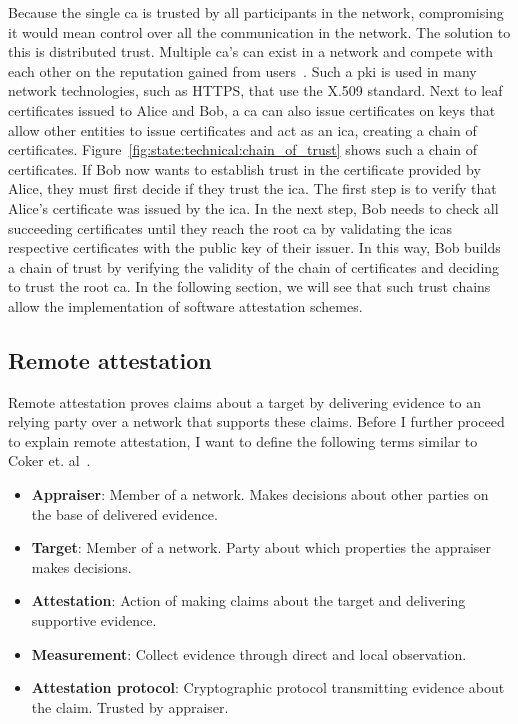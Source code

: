 Because the single \gls{ca} is trusted by all participants in the network,
compromising it would mean control over all the communication in the network.
The solution to this is distributed trust. Multiple \gls{ca}'s can exist in a
network and compete with each other on the reputation gained from
users~\cite{perlman1999overview}. Such a \gls{pki} is used in many network
technologies, such as HTTPS, that use the X.509 standard. Next to leaf
certificates issued to Alice and Bob, a \gls{ca} can also issue certificates on
keys that allow other entities to issue certificates and act as an \gls{ica},
creating a chain of certificates.
Figure~\ref{fig:state:technical:chain_of_trust} shows such a chain of
certificates. If Bob now wants to establish trust in the certificate provided by
Alice, they must first decide if they trust the \gls{ica}. The first step is to
verify that Alice's certificate was issued by the \gls{ica}. In the next step,
Bob needs to check all succeeding certificates until they reach the root
\gls{ca} by validating the \glspl{ica} respective certificates with the public
key of their issuer. In this way, Bob builds a chain of trust by verifying the
validity of the chain of certificates and deciding to trust the root \gls{ca}.
In the following section, we will see that such trust chains allow the
implementation of software attestation schemes.

\subsection{Remote attestation}
\label{sec:20:remote_attestation}
Remote attestation proves claims about a target
by delivering evidence to an relying party over a network that supports these
claims. Before I further proceed to explain remote attestation, I want to
define the following terms similar to Coker et. al~\cite{coker_principles_2011}.
\begin{itemize}
  \item \textbf{Appraiser}: Member of a network. Makes decisions about other
    parties on the base of delivered evidence.
  \item \textbf{Target}: Member of a network. Party about which properties the
    appraiser makes decisions.
  \item \textbf{Attestation}: Action of making claims about the target and
    delivering supportive evidence.
  \item \textbf{Measurement}: Collect evidence through direct and local
    observation.
  \item \textbf{Attestation protocol}: Cryptographic protocol transmitting
    evidence about the claim. Trusted by appraiser.
\end{itemize}

